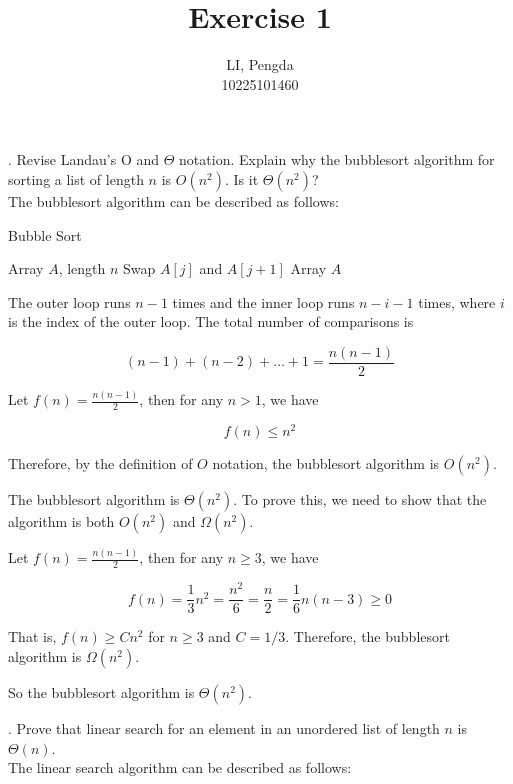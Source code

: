 \documentclass{article}
\begin{document}
\title{Exercise 1}
\author{LI, Pengda \\ 10225101460}
\date{}
\maketitle

. Revise Landau’s O and $\Theta$ notation.
\noindent Explain why the bubblesort algorithm for sorting a list of length $n$ is $O(n^2)$. Is it $\Theta(n^2)$?\\

The bubblesort algorithm can be described as follows:

\begin{algorithm}
\caption{Bubble Sort}
\begin{algorithmic}[1]
\Require Array $A$, length $n$
            \State Swap $A[j]$ and $A[j + 1]$
        \EndIf
    \EndFor
\EndFor
\State \Return Array $A$
\end{algorithmic}
\end{algorithm}

The outer loop runs $n - 1$ times and the inner loop runs $n - i - 1$ times, where $i$ is the index of the outer loop. The total number of comparisons is 

\[
(n - 1) + (n - 2) + \dots + 1 = \frac{n(n - 1)}{2}
\]

Let $f(n) = \frac{n(n-1)}{2}$, then for any $n > 1$, we have 

\[
f(n) \leq n^2
\]

Therefore, by the definition of $O$ notation, the bubblesort algorithm is $O(n^2)$.

The bubblesort algorithm is $\Theta(n^2)$. To prove this, we need to show that the algorithm is both $O(n^2)$ and $\Omega(n^2)$.

Let $f(n) = \frac{n(n-1)}{2}$, then for any $n \geq 3$, we have

\[
f(n) = \frac{1}{3} n^2 = \frac{n^2}{6} = \frac{n}{2} = \frac{1}{6} n(n - 3) \geq 0
\]

That is, $f(n) \geq Cn^2$ for $n \geq 3$ and $C = 1/3$. Therefore, the bubblesort algorithm is $\Omega(n^2)$.

So the bubblesort algorithm is $\Theta(n^2)$.

. Prove that linear search for an element in an unordered list of length $n$ is $\Theta(n)$.\\

The linear search algorithm can be described as follows:
\end{document}
